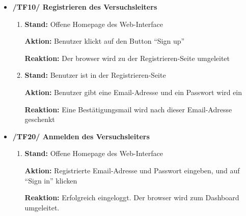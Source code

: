 \documentclass[a4paper]{scrreprt}
\begin{document}
            \begin{itemize}
                \item \textbf{/TF10/ Registrieren des \gls{Versuchsleiter}s}
                    \begin{enumerate}
                        \item \par \textbf{Stand: }Offene Homepage des \gls{Web-Interface}
                            \par \textbf{Aktion: }Benutzer klickt auf den Button ``Sign up''
                            \par \textbf{Reaktion: }Der browser wird zu der Registrieren-Seite umgeleitet
                        \item \par \textbf{Stand: }Benutzer ist in der Registrieren-Seite
                             \par \textbf{Aktion: }Benutzer gibt eine Email-Adresse und ein Passwort wird ein
                             \par \textbf{Reaktion: }Eine Bestätigungsmail wird nach dieser Email-Adresse geschenkt
                   \end{enumerate}

                    \item \textbf{/TF20/ Anmelden des \gls{Versuchsleiter}s}
                        \begin{enumerate}
                            \item \par \textbf{Stand: }Offene Homepage des \gls{Web-Interface}
                                \par \textbf{Aktion: }Registrierte Email-Adresse und Passwort eingeben, und auf “Sign in” klicken
                                \par \textbf{Reaktion: }Erfolgreich eingeloggt. Der browser wird zum Dashboard umgeleitet.
                        \end{enumerate}


\end{itemize}
\end{document}
